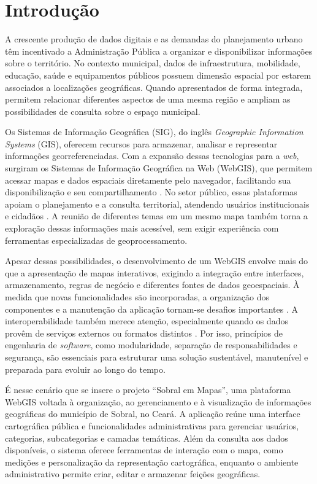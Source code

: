 \chapter{Introdução}
\label{cap:introducao}

A crescente produção de dados digitais e as demandas do planejamento urbano têm incentivado a Administração Pública a organizar e disponibilizar informações sobre o território. No contexto municipal, dados de infraestrutura, mobilidade, educação, saúde e equipamentos públicos possuem dimensão espacial por estarem associados a localizações geográficas. Quando apresentados de forma integrada, permitem relacionar diferentes aspectos de uma mesma região e ampliam as possibilidades de consulta sobre o espaço municipal.

Os Sistemas de Informação Geográfica (SIG), do inglês \textit{Geographic Information Systems} (GIS), oferecem recursos para armazenar, analisar e representar informações georreferenciadas. Com a expansão dessas tecnologias para a \textit{web}, surgiram os Sistemas de Informação Geográfica na Web (WebGIS), que permitem acessar mapas e dados espaciais diretamente pelo navegador, facilitando sua disponibilização e seu compartilhamento \cite{Silva2013}. No setor público, essas plataformas apoiam o planejamento e a consulta territorial, atendendo usuários institucionais e cidadãos \cite{Alcantara2015}. A reunião de diferentes temas em um mesmo mapa também torna a exploração dessas informações mais acessível, sem exigir experiência com ferramentas especializadas de geoprocessamento.

Apesar dessas possibilidades, o desenvolvimento de um \gls{WebGIS} envolve mais do que a apresentação de mapas interativos, exigindo a integração entre interfaces, armazenamento, regras de negócio e diferentes fontes de dados geoespaciais. À medida que novas funcionalidades são incorporadas, a organização dos componentes e a manutenção da aplicação tornam-se desafios importantes \cite{VinuezaMartinez2024}. A interoperabilidade também merece atenção, especialmente quando os dados provêm de serviços externos ou formatos distintos \cite{BastosCamboim2022}. Por isso, princípios de engenharia de \textit{software}, como modularidade, separação de responsabilidades e segurança, são essenciais para estruturar uma solução sustentável, manutenível e preparada para evoluir ao longo do tempo.

É nesse cenário que se insere o projeto ``Sobral em Mapas'', uma plataforma \gls{WebGIS} voltada à organização, ao gerenciamento e à visualização de informações geográficas do município de Sobral, no Ceará. A aplicação reúne uma interface cartográfica pública e funcionalidades administrativas para gerenciar usuários, categorias, subcategorias e camadas temáticas. Além da consulta aos dados disponíveis, o sistema oferece ferramentas de interação com o mapa, como medições e personalização da representação cartográfica, enquanto o ambiente administrativo permite criar, editar e armazenar feições geográficas.

